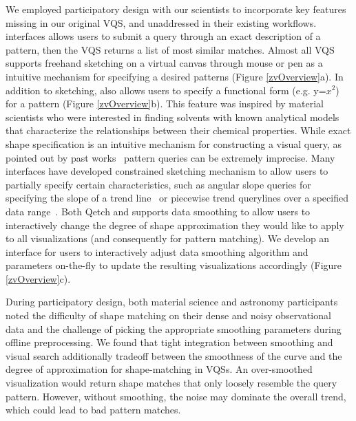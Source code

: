 \par We employed participatory design with our scientists to incorporate key features missing in our original VQS, and unaddressed in their existing workflows. %
 interfaces allows users to submit a query through an exact description of a pattern, then the VQS returns a list of most similar matches. Almost all VQS supports freehand sketching on a virtual canvas through mouse or pen as a intuitive mechanism for specifying a desired patterns (Figure \ref{zvOverview}a). In addition to sketching, \zv also allows users to specify a functional form (e.g. y=$x^2$) for a pattern (Figure \ref{zvOverview}b). This feature was inspired by material scientists who were interested in finding solvents with known analytical models that characterize the relationships between their chemical properties.
While exact shape specification is an intuitive mechanism for constructing a visual query, as pointed out by past works~\cite{correll2016semantics,Holz2009} pattern queries can be extremely imprecise. Many interfaces have developed constrained sketching mechanism to allow users to partially specify certain characteristics, such as angular slope queries for specifying the slope of a trend line~\cite{Hochheiser2004} or piecewise trend querylines over a specified data range~\cite{ryall2005querylines}. Both Qetch and \zv supports data smoothing to allow users to interactively change the degree of shape approximation they would like to apply to all visualizations (and consequently for pattern matching). We develop an interface for users to interactively adjust data smoothing algorithm and parameters on-the-fly to update the resulting visualizations accordingly (Figure \ref{zvOverview}c).
\par During participatory design, both material science and astronomy participants noted the difficulty of shape matching on their dense and noisy observational data and the challenge of picking the appropriate smoothing parameters during offline preprocessing. We found that tight integration between smoothing and visual search additionally tradeoff between the smoothness of the curve and the degree of approximation for shape-matching in VQSs. An over-smoothed visualization would return shape matches that only loosely resemble the query pattern. However, without smoothing, the noise may dominate the overall trend, which could lead to bad pattern matches.
